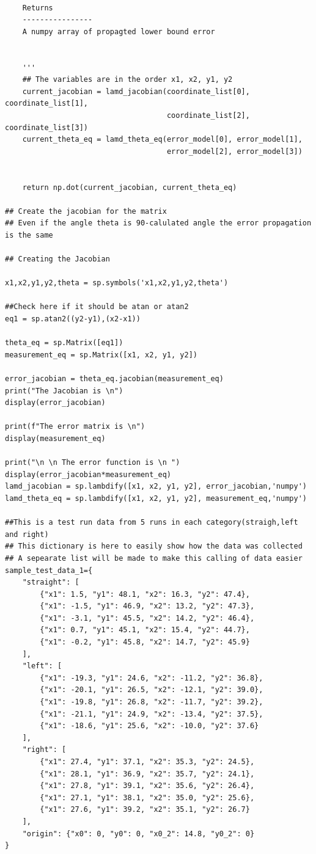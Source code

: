 {\begin{itemize}
\begin{verbatim}
    
    Returns
    ----------------
    A numpy array of propagted lower bound error
    
    
    '''
    ## The variables are in the order x1, x2, y1, y2
    current_jacobian = lamd_jacobian(coordinate_list[0], coordinate_list[1],
                                     coordinate_list[2], coordinate_list[3])
    current_theta_eq = lamd_theta_eq(error_model[0], error_model[1],
                                     error_model[2], error_model[3])
   

    return np.dot(current_jacobian, current_theta_eq)
    
## Create the jacobian for the matrix
## Even if the angle theta is 90-calulated angle the error propagation is the same 

## Creating the Jacobian

x1,x2,y1,y2,theta = sp.symbols('x1,x2,y1,y2,theta')

##Check here if it should be atan or atan2
eq1 = sp.atan2((y2-y1),(x2-x1))

theta_eq = sp.Matrix([eq1])
measurement_eq = sp.Matrix([x1, x2, y1, y2])

error_jacobian = theta_eq.jacobian(measurement_eq)
print("The Jacobian is \n")
display(error_jacobian)

print(f"The error matrix is \n")
display(measurement_eq)

print("\n \n The error function is \n ")
display(error_jacobian*measurement_eq)
lamd_jacobian = sp.lambdify([x1, x2, y1, y2], error_jacobian,'numpy')
lamd_theta_eq = sp.lambdify([x1, x2, y1, y2], measurement_eq,'numpy')

##This is a test run data from 5 runs in each category(straigh,left and right)
## This dictionary is here to easily show how the data was collected 
## A sepearate list will be made to make this calling of data easier
sample_test_data_1={
    "straight": [
        {"x1": 1.5, "y1": 48.1, "x2": 16.3, "y2": 47.4},
        {"x1": -1.5, "y1": 46.9, "x2": 13.2, "y2": 47.3},
        {"x1": -3.1, "y1": 45.5, "x2": 14.2, "y2": 46.4},
        {"x1": 0.7, "y1": 45.1, "x2": 15.4, "y2": 44.7},
        {"x1": -0.2, "y1": 45.8, "x2": 14.7, "y2": 45.9}
    ],
    "left": [
        {"x1": -19.3, "y1": 24.6, "x2": -11.2, "y2": 36.8},
        {"x1": -20.1, "y1": 26.5, "x2": -12.1, "y2": 39.0},
        {"x1": -19.8, "y1": 26.8, "x2": -11.7, "y2": 39.2},
        {"x1": -21.1, "y1": 24.9, "x2": -13.4, "y2": 37.5},
        {"x1": -18.6, "y1": 25.6, "x2": -10.0, "y2": 37.6}
    ],
    "right": [
        {"x1": 27.4, "y1": 37.1, "x2": 35.3, "y2": 24.5},
        {"x1": 28.1, "y1": 36.9, "x2": 35.7, "y2": 24.1},
        {"x1": 27.8, "y1": 39.1, "x2": 35.6, "y2": 26.4},
        {"x1": 27.1, "y1": 38.1, "x2": 35.0, "y2": 25.6},
        {"x1": 27.6, "y1": 39.2, "x2": 35.1, "y2": 26.7}
    ],
    "origin": {"x0": 0, "y0": 0, "x0_2": 14.8, "y0_2": 0}
}


\end{verbatim}
\end{itemize}}
